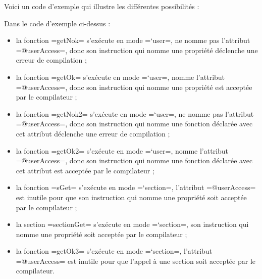 Voici un code d'exemple qui illustre les différentes possibilités :

Dans le code d'exemple ci-dessus :
\begin{itemize}
  \item la fonction \plm=getNok= s'exécute en mode \plm=`user=, ne nomme pas l'attribut \plm=@userAccess=, donc son instruction qui nomme une propriété déclenche une erreur de compilation ;
  \item la fonction \plm=getOk= s'exécute en mode \plm=`user=, nomme l'attribut \plm=@userAccess=, donc son instruction qui nomme une propriété est acceptée par le compilateur ;
  \item la fonction \plm=getNok2= s'exécute en mode \plm=`user=, ne nomme pas l'attribut \plm=@userAccess=, donc son instruction qui nomme une fonction déclarée avec cet attribut déclenche une erreur de compilation ;
  \item la fonction \plm=getOk2= s'exécute en mode \plm=`user=, nomme l'attribut \plm=@userAccess=, donc son instruction qui nomme une fonction déclarée avec cet attribut est acceptée par le compilateur ;
  \item la fonction \plm=sGet= s'exécute en mode \plm=`section=, l'attribut \plm=@userAccess= est inutile pour que son instruction qui nomme une propriété soit acceptée par le compilateur ;
  \item la section \plm=sectionGet= s'exécute en mode \plm=`section=, son instruction qui nomme une propriété soit acceptée par le compilateur ;
  \item la fonction \plm=getOk3= s'exécute en mode \plm=`section=, l'attribut \plm=@userAccess= est inutile pour que l'appel à une section soit acceptée par le compilateur.
\end{itemize}



